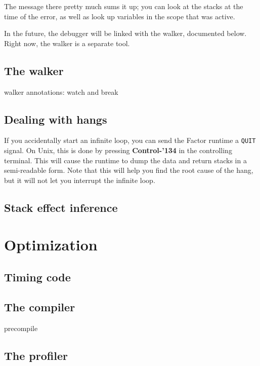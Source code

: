 \documentclass{article}
\newcommand{\ttbs}{\char'134}
\begin{document}
The message there pretty much sums it up; you can look at the stacks at the time of the error, as well as look up variables in the scope that was active.

In the future, the debugger will be linked with the walker, documented below. Right now, the walker is a separate tool.

\subsection{The walker}

walker
annotations: watch and break

\subsection{Dealing with hangs}

If you accidentally start an infinite loop, you can send the Factor runtime a \texttt{QUIT} signal. On Unix, this is done by pressing \textbf{Control-\ttbs} in the controlling terminal. This will cause the runtime to dump the data and return stacks in a semi-readable form. Note that this will help you find the root cause of the hang, but it will not let you interrupt the infinite loop.

\subsection{Stack effect inference}

\section{Optimization}

\subsection{Timing code}

\subsection{\label{compiler}The compiler}

precompile

\subsection{The profiler}
\end{document}
